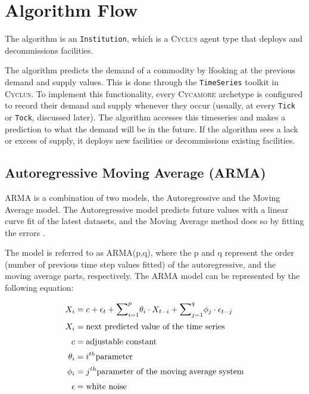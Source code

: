 \documentclass[11pt,letterpaper]{article}
\newcommand{\Cyclus}{\textsc{Cyclus}\xspace}%
\newcommand{\Cycamore}{\textsc{Cycamore}\xspace}%
\begin{document}
\section{Algorithm Flow}

The algorithm is an \texttt{Institution}, which is a \Cyclus agent type
that deploys and decommissions facilities. 

The algorithm predicts the demand of a commodity by lfooking at the previous demand and supply values.
This is done through the \texttt{TimeSeries} toolkit in \Cyclus. To implement
this functionality, every \Cycamore archetype is configured to record their
demand and supply whenever they occur (usually, at every \texttt{Tick} or \texttt{Tock},
discussed later). The algorithm accesses this timeseries and makes a prediction to
what the demand will be in the future. If the algorithm sees a lack or excess of supply,
it deploys new facilities or decommissions existing facilities.

\subsection{Autoregressive Moving Average (ARMA)}

\gls{ARMA} is a combination of two models, the Autoregressive
and the Moving Average model. The Autoregressive model 
predicts future values with a linear curve fit of the latest
datasets, and the Moving Average method does so by fitting the 
errors \cite{stine_introduction_2011}.

The model is referred to as ARMA(p,q), where the p and q represent 
the order (number of previous time step values fitted) of the autoregressive,
and the moving average parts,
respectively. 
The \gls{ARMA} model can be represented by the following equation:

\begin{align}
    X_i&=c + \epsilon_t + {\mathlarger{\sum}}_{i=1}^{p}\theta_i \cdot X_{t-i}+
     {\mathlarger{\sum}}_{j=1}^{q}\phi_j\cdot\epsilon_{t-j}\\
    X_i&= \mbox{next predicted value of the time series}\\
    c&= \mbox{adjustable constant}\\
    \theta_i&=i^{th} \mbox{parameter}\\
    \phi_i&=j^{th} \mbox{parameter of the moving average system}\\
    \epsilon &= \mbox{white noise}
\end{align}
\end{document}
